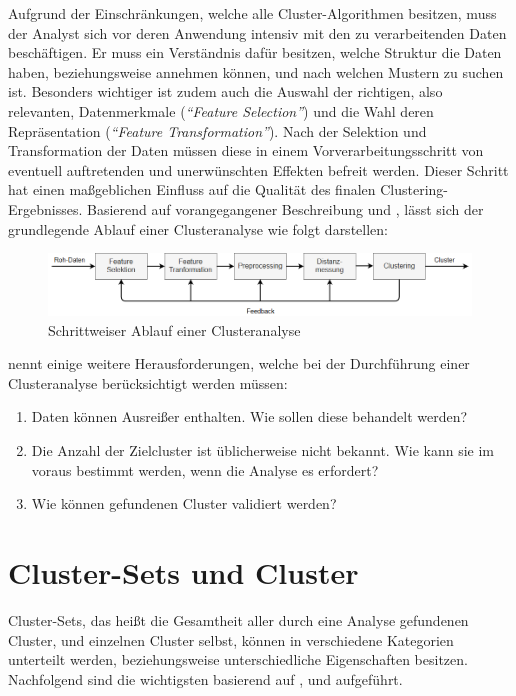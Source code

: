 Aufgrund der Einschränkungen, welche alle Cluster-Algorithmen besitzen, muss der Analyst sich vor deren Anwendung intensiv
mit den zu verarbeitenden Daten beschäftigen. Er muss ein Verständnis dafür besitzen, welche Struktur die Daten
haben, beziehungsweise annehmen können, und nach welchen Mustern zu suchen ist.
Besonders wichtiger ist zudem auch die Auswahl der richtigen, also relevanten, Datenmerkmale (\textit{``Feature Selection''})
und die Wahl deren Repräsentation (\textit{``Feature Transformation''}).
Nach der Selektion und Transformation der Daten müssen diese in einem Vorverarbeitungsschritt von eventuell auftretenden
und unerwünschten Effekten befreit werden. Dieser Schritt hat einen maßgeblichen Einfluss auf die Qualität des finalen Clustering-Ergebnisses.
Basierend auf vorangegangener Beschreibung und \cite[]{Jain1999}, lässt sich der grundlegende Ablauf einer Clusteranalyse wie folgt darstellen: \\

\begin{figure}[H]
    \centering
    \includegraphics[width=\linewidth]{resources/img/grundlagen/clustering_flow}
    \caption[Ablauf einer Clusteranalyse]{Schrittweiser Ablauf einer Clusteranalyse}
    \label{fig:grund_clustering_workflow}
\end{figure}

\cite[]{Jain2010} nennt einige weitere Herausforderungen, welche bei der Durchführung einer Clusteranalyse berücksichtigt werden müssen:

\begin{enumerate}
    \item Daten können Ausreißer enthalten. Wie sollen diese behandelt werden?
    \item Die Anzahl der Zielcluster ist üblicherweise nicht bekannt. Wie kann sie im voraus bestimmt werden, wenn die Analyse es erfordert?
    \item Wie können gefundenen Cluster validiert werden?
\end{enumerate}

\section{Cluster-Sets und Cluster}

Cluster-Sets, das heißt die Gesamtheit aller durch eine Analyse gefundenen Cluster, und einzelnen Cluster selbst,
können in verschiedene Kategorien unterteilt werden, beziehungsweise unterschiedliche Eigenschaften besitzen.
Nachfolgend sind die wichtigsten basierend auf \cite[]{tan2007introduction}, \cite[]{Jain1999} und \cite[]{Jain2010} aufgeführt.

